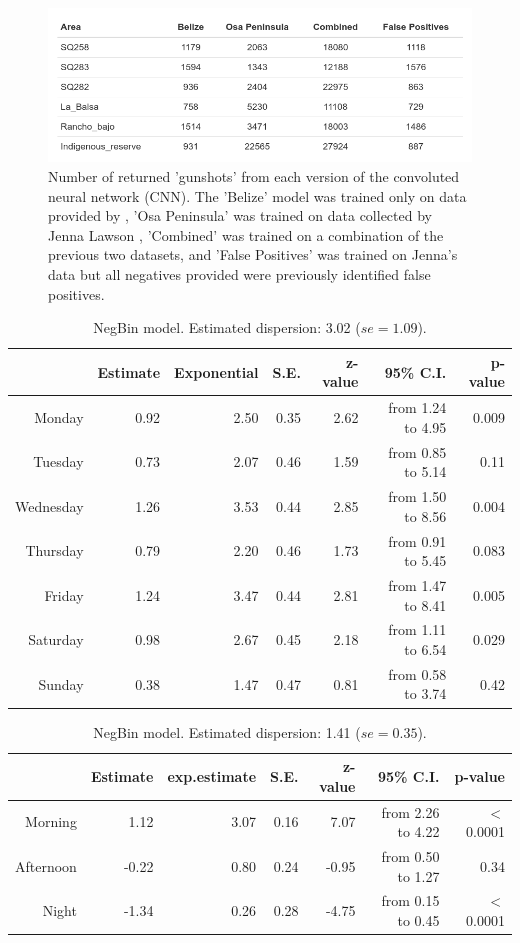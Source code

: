 \begin{figure}
\includegraphics[width=1.2\textwidth,center]{Figures/model_comparison}\caption[Model comparison]{Number of returned 'gunshots' from each version of the convoluted neural network (CNN). The 'Belize' model was trained only on data provided by \cite{Hill2018}, 'Osa Peninsula' was trained on data collected by Jenna Lawson \citep{Lawson2019}, 'Combined' was trained on a combination of the previous two datasets, and 'False Positives' was trained on Jenna's data but all negatives provided were previously identified false positives.}\label{fig:model_comparison}
\end{figure}



\begin{table}[!h]
\centering
\begingroup\footnotesize
\begin{tabular}{rrrrrrr}
  \hline
 & Estimate & Exponential & S.E. & z-value & 95\% C.I. & p-value \\
  \hline
Monday & 0.92 & 2.50 & 0.35 & 2.62 & from 1.24 to 4.95 & 0.009 \\
  Tuesday & 0.73 & 2.07 & 0.46 & 1.59 & from 0.85 to 5.14 & 0.11 \\
  Wednesday & 1.26 & 3.53 & 0.44 & 2.85 & from 1.50 to 8.56 & 0.004 \\
  Thursday & 0.79 & 2.20 & 0.46 & 1.73 & from 0.91 to 5.45 & 0.083 \\
  Friday & 1.24 & 3.47 & 0.44 & 2.81 & from 1.47 to 8.41 & 0.005 \\
  Saturday & 0.98 & 2.67 & 0.45 & 2.18 & from 1.11 to 6.54 & 0.029 \\
  Sunday & 0.38 & 1.47 & 0.47 & 0.81 & from 0.58 to 3.74 & 0.42 \\
   \hline
\end{tabular}
\endgroup
\caption{NegBin model. Estimated dispersion: 3.02 ($se=1.09$).}
\label{tab:glm.nb}
\end{table}


\begin{table}[!h]
\centering
\begingroup\footnotesize
\begin{tabular}{rrrrrrr}
  \hline
 & Estimate & exp.estimate & S.E. & z-value & 95\% C.I. & p-value \\
  \hline
Morning & 1.12 & 3.07 & 0.16 & 7.07 & from 2.26 to 4.22 & $<$ 0.0001 \\
  Afternoon & -0.22 & 0.80 & 0.24 & -0.95 & from 0.50 to 1.27 & 0.34 \\
  Night & -1.34 & 0.26 & 0.28 & -4.75 & from 0.15 to 0.45 & $<$ 0.0001 \\
   \hline
\end{tabular}
\endgroup
\caption{NegBin model. Estimated dispersion: 1.41 ($se=0.35$).}
\label{tab:glm.nb_time}
\end{table}
